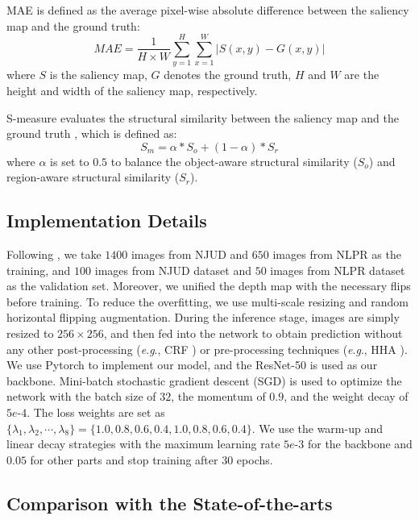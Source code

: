 \documentclass[journal]{IEEEtran}
\newcommand{\eg}{\textit{e}.\textit{g}.}
\begin{document}
 MAE is defined as the average pixel-wise absolute difference between the saliency map and the ground truth:
 \begin{equation}
 MAE = \frac{1}{H\times W}\sum_{y=1}^{H}\sum_{x=1}^{W}|S(x, y) - G(x, y)|
\end{equation}
where $S$ is the saliency map, $G$ denotes the ground truth, $H$ and $W$ are the height and width of the saliency map, respectively.

S-measure evaluates the structural similarity between the saliency map and the ground truth \cite{fan2017structure}, which is defined as:
 \begin{equation}
S_m = \alpha * S_o + (1-\alpha) * S_r
 \end{equation}
where $\alpha$ is set to $0.5$ to balance the object-aware structural similarity ($S_o$) and region-aware structural similarity ($S_r$).



\subsection{Implementation Details}
Following \cite{chen2018progressively}, we take $1400$ images from NJUD \cite{ju2014depth} and $650$ images from NLPR \cite{peng2014rgbd} as the training, and $100$ images from NJUD dataset and $50$ images from NLPR dataset as the validation set. Moreover, we unified the depth map with the necessary flips before training. To reduce the overfitting, we use multi-scale resizing and random horizontal flipping augmentation. During the inference stage, images are simply resized to $256\times 256$, and then fed into the network to obtain prediction without any other post-processing (\eg, CRF \cite{krahenbuhl2011efficient}) or pre-processing techniques (\eg, HHA \cite{gupta2014learning}). We use Pytorch to implement our model, and the ResNet-50 \cite{he2016deep} is used as our backbone. Mini-batch stochastic gradient descent (SGD) is used to optimize the network with the batch size of $32$, the momentum of $0.9$, and the weight decay of $5e\text{-}4$. The loss weights are set as $\{\lambda_1,\lambda_2, \cdots,\lambda_8\}=\{1.0,0.8,0.6,0.4,1.0,0.8,0.6,0.4\}$. We use the warm-up and linear decay strategies with the maximum learning rate $5e\text{-}3$ for the backbone and $0.05$ for other parts and stop training after $30$ epochs.
\subsection{Comparison with the State-of-the-arts}
\end{document}
